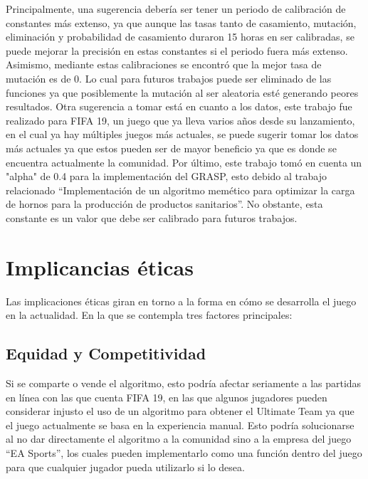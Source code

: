 \documentclass{article}
\begin{document}
Principalmente, una sugerencia debería ser tener un periodo de calibración de constantes más extenso, ya que aunque las tasas tanto de casamiento, mutación, eliminación y probabilidad de casamiento duraron 15 horas en ser calibradas, se puede mejorar la precisión en estas constantes si el periodo fuera más extenso.
Asimismo, mediante estas calibraciones se encontró que la mejor tasa de mutación es de 0. Lo cual para futuros trabajos puede ser eliminado de las funciones ya que posiblemente la mutación al ser aleatoria esté generando peores resultados.\newline
Otra sugerencia a tomar está en cuanto a los datos, este trabajo fue realizado para FIFA 19, un juego que ya lleva varios años desde su lanzamiento, en el cual ya hay múltiples juegos más actuales, se puede sugerir tomar los datos más actuales ya que estos pueden ser de mayor beneficio ya que es donde se encuentra actualmente la comunidad.\newline
Por último, este trabajo tomó en cuenta un "alpha" de 0.4 para la implementación del GRASP, esto debido al trabajo relacionado “Implementación de un algoritmo memético para optimizar la carga de hornos para la producción de productos sanitarios”. No obstante, esta constante es un valor que debe ser calibrado para futuros trabajos.


\section{Implicancias éticas}

Las implicaciones éticas giran en torno a la forma en cómo se desarrolla el juego en la actualidad. En la que se contempla tres factores principales: \newline

\subsection{Equidad y Competitividad}
    Si se comparte o vende el algoritmo, esto podría afectar seriamente a las partidas en línea con las que cuenta FIFA 19, en las que algunos jugadores pueden considerar injusto el uso de un algoritmo para obtener el Ultimate Team  ya que el juego actualmente se basa en la experiencia manual. Esto podría solucionarse al no dar directamente el algoritmo a la comunidad sino a la empresa del juego “EA Sports”, los cuales pueden implementarlo como una función dentro del juego para que cualquier jugador pueda utilizarlo si lo desea.
\end{document}
